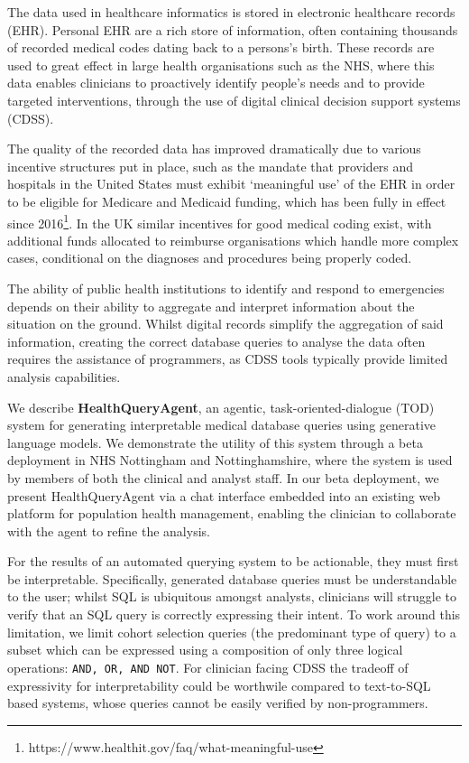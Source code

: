 \documentclass[11pt]{article}
\begin{document}
The data used in healthcare informatics is stored in electronic healthcare records (EHR). Personal EHR are a rich store of information, often containing thousands of recorded medical codes dating back to a persons's birth. These records are used to great effect in large health organisations such as the NHS, where this data enables clinicians to proactively identify people's needs and to provide targeted interventions, through the use of digital clinical decision support systems (CDSS).


The quality of the recorded data has improved dramatically due to various incentive structures put in place, such as the mandate that providers and hospitals in the United States must exhibit `meaningful use' of the EHR in order to be eligible for Medicare and Medicaid funding, which has been fully in effect since 2016\footnote{https://www.healthit.gov/faq/what-meaningful-use}. In the UK similar incentives for good medical coding exist, with additional funds allocated to reimburse organisations which handle more complex cases, conditional on the diagnoses and procedures being properly coded.


The ability of public health institutions to identify and respond to emergencies depends on their ability to aggregate and interpret information about the situation on the ground. Whilst digital records simplify the aggregation of said information, creating the correct database queries to analyse the data often requires the assistance of programmers, as CDSS tools typically provide limited analysis capabilities.



We describe \textbf{HealthQueryAgent}, an agentic, task-oriented-dialogue (TOD) system for generating interpretable medical database queries using generative language models. We demonstrate the utility of this system through a beta deployment in NHS Nottingham and Nottinghamshire, where the system is used by members of both the clinical and analyst staff.
In our beta deployment, we present HealthQueryAgent via a chat interface embedded into an existing web platform for population health management, enabling the clinician to collaborate with the agent to refine the analysis. %

For the results of an automated querying system to be actionable, they must first be interpretable. Specifically, generated database queries must be understandable to the user; whilst SQL is ubiquitous amongst analysts, clinicians will struggle to verify that an SQL query is correctly expressing their intent. To work around this limitation, we limit cohort selection queries (the predominant type of query) to a subset which can be expressed using a composition of only three logical operations: \texttt{AND, OR, AND NOT}. For clinician facing CDSS the tradeoff of expressivity for interpretability could be worthwile compared to text-to-SQL based systems, whose queries cannot be easily verified by non-programmers.
\end{document}
